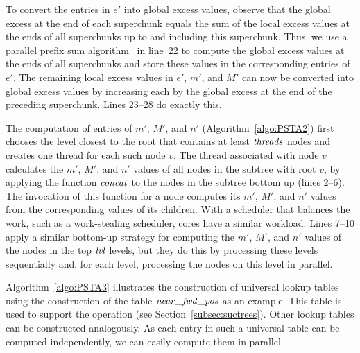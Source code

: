 To convert the entries in $e'$ into global excess values, observe that the
global excess at the end of each superchunk equals the sum of the local excess
values at the ends of all superchunks up to and including this superchunk.
Thus, we use a parallel prefix sum algorithm~\cite{Helman2001265} in line~22
to compute the global excess values at the ends of all superchunks and store
these values in the corresponding entries of $e'$.
The remaining local excess values in $e'$, $m'$, and $M'$ can now be converted
into global excess values by increasing each by the global excess at the end
of the preceding superchunk.
Lines 23--28 do exactly this.

The computation of entries of $m'$, $M'$, and $n'$ (Algorithm~\ref{algo:PSTA2})
first chooses the level closest to the root that contains at least $\mathit{threads}$
nodes and creates one thread for each such node $v$.
The thread associated with node $v$ calculates the $m'$, $M'$, and $n'$ values
of all nodes in the subtree with root $v$, by applying the function
$\mathit{concat}$ to the nodes in the subtree bottom up (lines 2--6).
The invocation of this function for a node computes its $m'$, $M'$, and $n'$
values from the corresponding values of its children.
With a scheduler that balances the work, such as a
work-stealing scheduler, cores have a similar workload.
Lines 7--10 apply a similar bottom-up strategy for computing the $m'$, $M'$,
and $n'$ values of the nodes in the top $\mathit{lvl}$ levels, but they do this by
processing these levels sequentially and, for each level, processing the
nodes on this level in parallel.

Algorithm~\ref{algo:PSTA3} illustrates the construction of universal lookup
tables using the construction of the table $\mathit{near\_fwd\_pos}$ as an example.
This table is used to support the {\fwdsearch} operation (see
Section~\ref{subsec:suctrees}).
Other lookup tables can be constructed analogously.
As each entry in such a universal table can be computed independently, we can
easily compute them in parallel.
